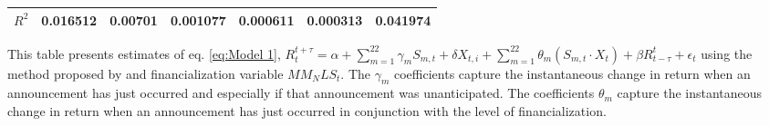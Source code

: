 \begin{sidewaystable}
{\begin{tabular}{@{}lllllllllllll@{}}
\textbf{$R^2$}             &\multicolumn{2}{c}{ 0.016512 }                                                 & \multicolumn{2}{c}{ 0.00701 }                                                 & \multicolumn{2}{c}{ 0.001077 }                                                 & \multicolumn{2}{c}{ 0.000611 }                                                 & \multicolumn{2}{c}{ 0.000313 }                                                   & \multicolumn{2}{c}{ 0.041974 }                                                 \\ \bottomrule 
\end{tabular}
}
\begin{tablenotes}\item 
    \singlespacing
    \footnotesize
    This table presents estimates of eq. \ref{eq:Model 1}, $R_{t}^{t+\tau}=\alpha+\sum_{m=1}^{22} \gamma_m S_{m,t}+ \delta X_{t,i} + \sum_{m=1}^{22} \theta_m (S_{m,t} \cdot X_t)+\beta R_{t-\tau}^{t}+\epsilon_{t}$ using the method proposed by \citet{kurov2019price} and financialization variable $MM_NLS_t$. The $\gamma_m$ coefficients capture the instantaneous change in return when an announcement has just occurred and especially if that announcement was unanticipated. The coefficients $\theta_m$ capture the instantaneous change in return when an announcement has just occurred in conjunction with the level of financialization.
\end{tablenotes}
\end{sidewaystable}

